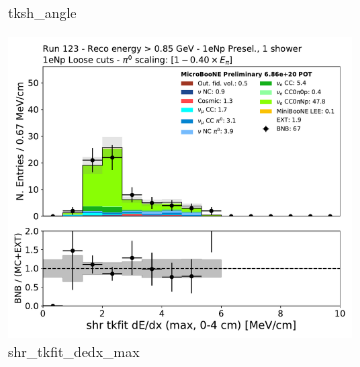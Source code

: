 \begin{figure}[H]
\begin{subfigure}{0.3\textwidth}
    \caption{tksh\_angle}
    \end{subfigure}
    \begin{subfigure}{0.3\textwidth}
    \includegraphics[width=1.0\textwidth]{Sidebands/Figures/1eNp/HighEnergy/HiEext_NPOneShr_NPL_pi0e040/shr_tkfit_dedx_max.pdf}
    \caption{shr\_tkfit\_dedx\_max}
    \end{subfigure}
    \caption{} 
    \label{fig:HE_1eNp_L_1}
\end{figure}

